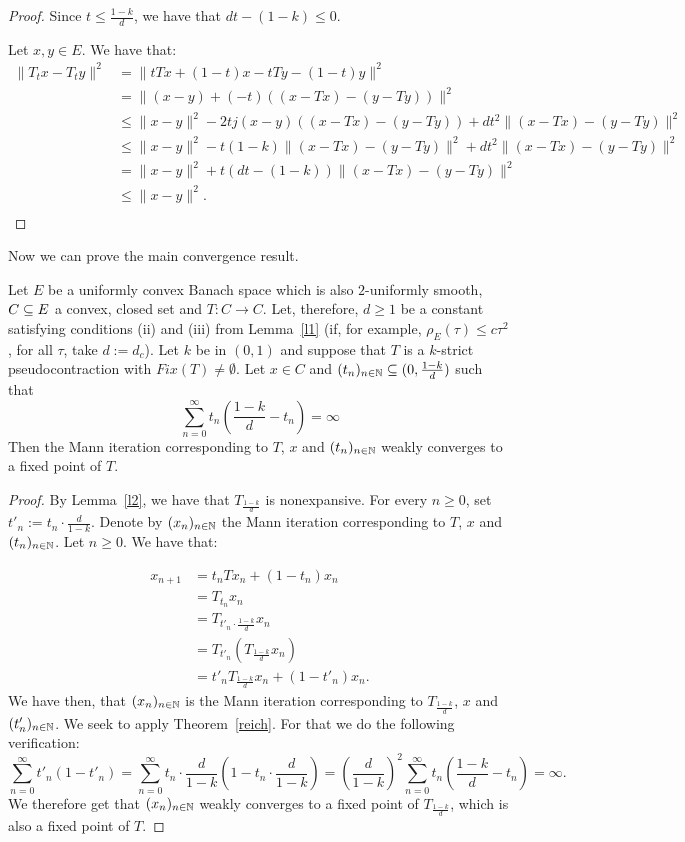 \documentclass{article}
\begin{document}
\begin{proof}
Since $t \leq \frac{1-k}{d}$, we have that $dt-(1-k) \leq 0$.

Let $x,y \in E$. We have that:
\begin{align*}
 \|T_tx - T_ty\|^2 &= \|tTx + (1-t)x -tTy - (1-t)y\|^2 \\
 &= \|(x-y) + (-t)((x-Tx)-(y-Ty))\|^2 \\
 &\leq \|x-y\|^2 -2tj(x-y)((x-Tx)-(y-Ty)) + dt^2\|(x-Tx)-(y-Ty)\|^2\\
 &\leq \|x-y\|^2 -t(1-k)\|(x-Tx)-(y-Ty)\|^2  + dt^2\|(x-Tx)-(y-Ty)\|^2\\
 &= \|x-y\|^2 +t(dt - (1-k))\|(x-Tx)-(y-Ty)\|^2 \\
 &\leq \|x-y\|^2.\\
\end{align*}
\end{proof}

Now we can prove the main convergence result.

\bthm\label{main}
Let $E$ be a uniformly convex Banach space which is also $2$-uniformly smooth, $C\subseteq E$ a convex, closed set and $T: C \to C$. Let, therefore, $d\geq 1$ be a constant satisfying conditions (ii) and (iii) from Lemma~\ref{l1} (if, for example, $\rho_E(\tau) \leq c \tau^2$, for all $\tau$, take $d:=d_c$). Let $k$ be in $(0,1)$ and suppose that $T$ is a $k$-strict pseudocontraction with $Fix(T)\neq\emptyset$. Let $x \in C$ and $(t_n)_{n \in {\mathbb N}} \subseteq (0,\frac{1-k}{d})$ such that
$$\sum_{n=0}^\infty t_n\left(\frac{1-k}{d}-t_n\right) = \infty$$
Then the Mann iteration corresponding to $T$, $x$ and $(t_n)_{n \in {\mathbb N}}$ weakly converges to a fixed point of $T$.
\ethm

\begin{proof}
By Lemma~\ref{l2}, we have that $T_{\frac{1-k}{d}}$ is nonexpansive. For every $n \geq 0$, set $t'_n:=t_n \cdot \frac{d}{1-k}$. Denote by $(x_n)_{n \in {\mathbb N}}$ the Mann iteration corresponding to $T$, $x$ and $(t_n)_{n \in {\mathbb N}}$. Let $n \geq 0$. We have that:

\begin{align*}
x_{n+1} &= t_nTx_n + (1-t_n)x_n \\
&= T_{t_n}x_n \\
&= T_{t'_n \cdot \frac{1-k}{d}} x_n \\
&= T_{t'_n} (T_{\frac{1-k}{d}} x_n) \\
&= t'_n T_{\frac{1-k}{d}} x_n + (1-t'_n) x_n .
\end{align*}
We have then, that $(x_n)_{n \in {\mathbb N}}$ is the Mann iteration corresponding to $T_{\frac{1-k}{d}}$, $x$ and $(t'_n)_{n \in {\mathbb N}}$. We seek to apply Theorem~\ref{reich}. For that we do the following verification:
$$\sum_{n=0}^\infty t'_n (1-t'_n) = \sum_{n=0}^\infty t_n \cdot \frac{d}{1-k} \left(1- t_n \cdot \frac{d}{1-k} \right) = \left(\frac{d}{1-k}\right)^2  \sum_{n=0}^\infty t_n\left(\frac{1-k}{d}-t_n\right) = \infty.$$
We therefore get that $(x_n)_{n \in {\mathbb N}}$ weakly converges to a fixed point of $T_{\frac{1-k}{d}}$, which is also a fixed point of $T$.
\end{proof}
\end{document}
